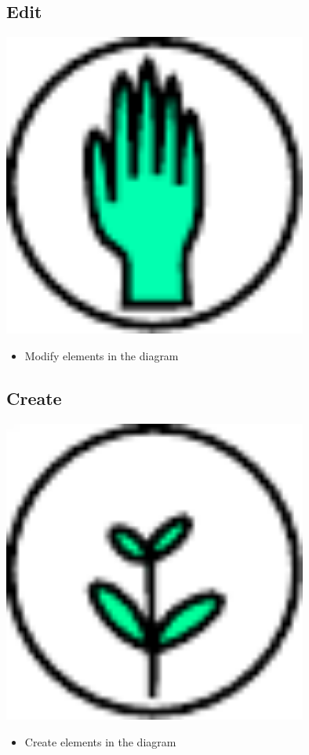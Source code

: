 \subsection{Edit}

\includegraphics[width=10cm]{../../gui/source/resources/tool_edit.pdf}
\begin{itemize}
\item Modify elements in the diagram
\end{itemize}

\subsection{Create}

\includegraphics[width=10cm]{../../gui/source/resources/tool_create.pdf}
\begin{itemize}
\item Create elements in the diagram
\end{itemize}

